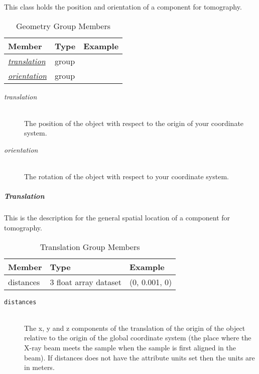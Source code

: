 This class holds the position and orientation of a component for tomography.

\begin{table}[h!]\sffamily \footnotesize
\centering
\caption{Geometry Group Members}
\begin{tabular}{l l l}
\toprule
\bfseries Member     & \bfseries Type & \bfseries Example \\
\midrule

\hyperref[tomo:translation]{\emph{translation}} & group &  \\
\hyperref[tomo:orientation]{\emph{orientation}} & group & \\

\bottomrule
\end{tabular}
\end{table}

\begin{description}
\item[\emph{translation}] \hfill \\
{The position of the object with respect to the origin of your coordinate system.}

\item[\emph{orientation}] \hfill \\
{The rotation of the object with respect to your coordinate system.}
\end{description}

\subparagraph{Translation}
\label{tomo:translation}

This is the description for the general spatial location of a component for tomography.

\begin{table}[h!]\sffamily \footnotesize
\centering
\caption{Translation Group Members}
\label{tomo:translation}
\begin{tabular}{l l l}
\toprule
\bfseries Member     & \bfseries Type & \bfseries Example \\
\midrule

distances & 3 float array dataset & (0, 0.001, 0) \\
\bottomrule
\end{tabular}
\end{table}

\begin{description}
\item[\tt {distances}] \hfill \\
{The x, y and z components of the translation of the origin of the object
relative to the origin of the global coordinate system (the place where 
the X-ray beam  meets the sample when the sample is first aligned in the beam).
If  distances does not have the attribute units set then the units are in
meters.}
\end{description}

